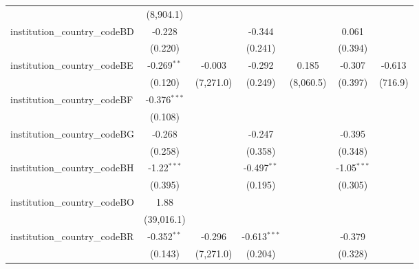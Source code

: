 \begin{tabular}{lcccccc}
                                         & (8,904.1)      &               &                &                &                &   \\   
   institution\_country\_codeBD          & -0.228         &               & -0.344         &                & 0.061          &   \\   
                                         & (0.220)        &               & (0.241)        &                & (0.394)        &   \\   
   institution\_country\_codeBE          & -0.269$^{**}$  & -0.003        & -0.292         & 0.185          & -0.307         & -0.613\\   
                                         & (0.120)        & (7,271.0)     & (0.249)        & (8,060.5)      & (0.397)        & (716.9)\\   
   institution\_country\_codeBF          & -0.376$^{***}$ &               &                &                &                &   \\   
                                         & (0.108)        &               &                &                &                &   \\   
   institution\_country\_codeBG          & -0.268         &               & -0.247         &                & -0.395         &   \\   
                                         & (0.258)        &               & (0.358)        &                & (0.348)        &   \\   
   institution\_country\_codeBH          & -1.22$^{***}$  &               & -0.497$^{**}$  &                & -1.05$^{***}$  &   \\   
                                         & (0.395)        &               & (0.195)        &                & (0.305)        &   \\   
   institution\_country\_codeBO          & 1.88           &               &                &                &                &   \\   
                                         & (39,016.1)     &               &                &                &                &   \\   
   institution\_country\_codeBR          & -0.352$^{**}$  & -0.296        & -0.613$^{***}$ &                & -0.379         &   \\   
                                         & (0.143)        & (7,271.0)     & (0.204)        &                & (0.328)        &   \\   

\end{tabular}

